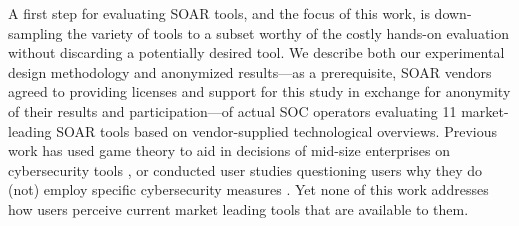 A first step for evaluating SOAR tools, and the focus of this work, is down-sampling the variety of tools to a subset worthy of the costly hands-on evaluation without discarding a potentially desired tool. 
We describe both our experimental design methodology and anonymized results---as a prerequisite, SOAR vendors agreed to providing licenses and support for this study in exchange for anonymity of their results and participation---of actual SOC operators evaluating 11 market-leading SOAR tools based on vendor-supplied technological overviews. Previous work has used game theory to aid in decisions of mid-size enterprises on cybersecurity tools \cite{decision_support}, or conducted user studies questioning users why they do (not) employ specific cybersecurity measures \cite{use_non_use}. Yet none of this work addresses how users perceive current market leading tools that are available to them.




